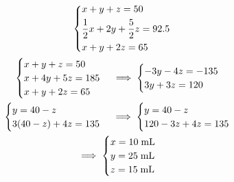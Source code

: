 \begin{soluzione}
    \begin{gather*}
        \begin{dcases}
            x+y+z=50\\
            \frac{1}{2}x + 2y + \frac{5}{2}z=92.5\\
            x + y + 2z=65
        \end{dcases}
        \\
        \begin{cases}
            x+y+z=50\\
            x + 4y + 5z=185\\
            x+y+2z=65
        \end{cases}
        \implies
        \begin{cases}
            -3y - 4z=-135\\
            3y+3z=120
        \end{cases}
        \\
        \begin{cases}
            y=40-z\\
            3(40-z) + 4z=135
        \end{cases}
        \implies
        \begin{cases}
            y=40-z\\
            120 - 3z + 4z=135
        \end{cases}
        \\
        \implies
        \begin{cases}
            x=10 \; \rm mL\\
            y=25 \; \rm mL\\
            z=15 \; \rm mL
        \end{cases}
    \end{gather*}
\end{soluzione}

\newpage

